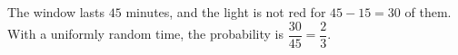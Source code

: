 The window lasts $45$ minutes, and the light is not red for $45-15=30$ of them. With a uniformly random time, the probability is $\dfrac{30}{45}=\boxed{\dfrac23}$.
